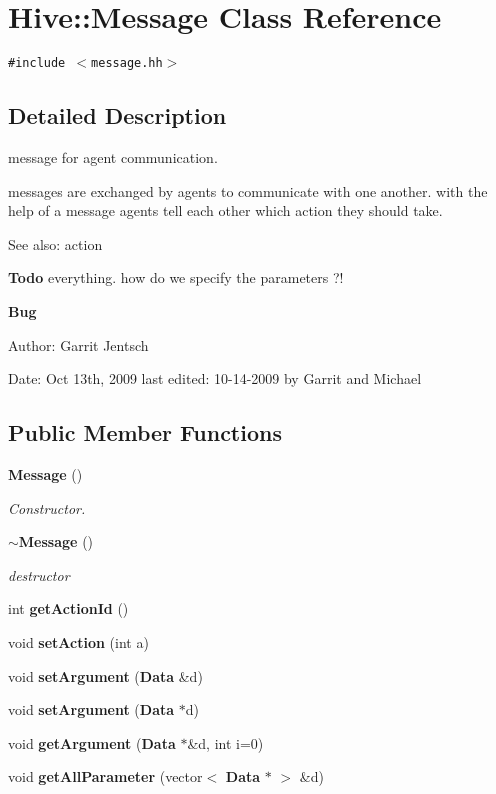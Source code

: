 \section{Hive::Message Class Reference}
\label{classHive_1_1Message}
{\tt \#include $<$message.hh$>$}



\subsection{Detailed Description}
message for agent communication. 

messages are exchanged by agents to communicate with one another. with the help of a message agents tell each other which action they should take.

\begin{Desc}
\item[See also:]action\end{Desc}
\begin{Desc}
\item[{\bf Todo}]everything. how do we specify the parameters ?!\end{Desc}
\begin{Desc}
\item[{\bf Bug}]\end{Desc}
\begin{Desc}
\item[Author:]Garrit Jentsch\end{Desc}
\begin{Desc}
\item[Date:]Oct 13th, 2009 last edited: 10-14-2009 by Garrit and Michael \end{Desc}
\subsection*{Public Member Functions}
\begin{CompactItemize}
\item 
{\bf Message} ()
\begin{CompactList}\small\item\em Constructor. \item\end{CompactList}\item 
{\bf $\sim$Message} ()
\begin{CompactList}\small\item\em destructor \item\end{CompactList}\item 
int {\bf getActionId} ()
\item 
void {\bf setAction} (int a)
\item 
void {\bf setArgument} ({\bf Data} \&d)
\item 
void {\bf setArgument} ({\bf Data} $\ast$d)
\item 
void {\bf getArgument} ({\bf Data} $\ast$\&d, int i=0)
\item 
void {\bf getAllParameter} (vector$<$ {\bf Data} $\ast$ $>$ \&d)
\end{CompactItemize}


